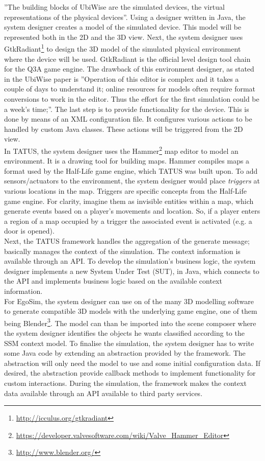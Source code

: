 ''The building blocks of UbiWise are the simulated devices, the virtual representations of the physical devices''\cite{barton2003ubiwise}. Using a designer written in Java, the system designer creates a model of the simulated device. This model will be represented both in the 2D and the 3D view. Next, the system designer uses GtkRadiant\footnote{\url{http://icculus.org/gtkradiant}} to design the 3D model of the simulated physical environment where the device will be used. GtkRadiant is the official level design tool chain for the Q3A game engine. The drawback of this environment designer, as stated in the UbiWise paper is ''Operation of this editor is complex and it takes a couple of days to understand it; online resources for models often require format conversions to work in the editor. Thus the effort for the first simulation could be a week's time;''\cite{barton2003ubiwise}. The last step is to provide functionality for the device. This is done by means of an XML configuration file. It configures various actions to be handled by custom Java classes. These actions will be triggered from the 2D view.\\

In TATUS, the system designer uses the Hammer\footnote{\url{https://developer.valvesoftware.com/wiki/Valve_Hammer_Editor}} map editor to model an environment. It is a drawing tool for building maps. Hammer compiles maps a format used by the Half-Life game engine, which TATUS was built upon. To add sensors/actuators to the environment, the system designer would place \emph{triggers} at various locations in the map. Triggers are specific concepts from the Half-Life game engine. For clarity, imagine them as invisible entities within a map, which generate events based on a player's movements and location. So, if a player enters a region of a map occupied by a trigger the associated event is activated (e.g. a door is opened).\\

Next, the TATUS framework handles the aggregation of the generate message; basically manages the context of the simulation. The context information is available through an API. To develop the simulation's business logic, the system designer implements a new System Under Test (SUT), in Java, which connects to the API and implements business logic based on the available context information.\\

For EgoSim, the system designer can use on of the many 3D modelling software to generate compatible 3D models with the underlying game engine, one of them being Blender\footnote{\url{http://www.blender.org/}}. The model can than be imported into the scene composer where the system designer identifies the objects he wants classified according to the SSM context model. To finalise the simulation, the system designer has to write some Java code by extending an abstraction provided by the framework. The abstraction will only need the model to use and some initial configuration data. If desired, the abstraction provide callback methods to implement functionality for custom interactions. During the simulation, the framework makes the context data available through an API available to third party services.\\

